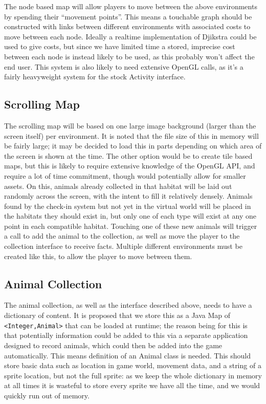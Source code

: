 \documentclass[12pt,a4paper,twoside]{article}
\begin{document}
The node based map will allow players to move between the above environments by spending their ``movement points''.
This means a touchable graph should be constructed with links between different environments with associated costs to move between each node.
Ideally a realtime implementation of Djikstra could be used to give costs, but since we have limited time a stored, imprecise cost between each node is instead likely to be used, as this probably won't affect the end user.
This system is also likely to need extensive OpenGL calls, as it's a fairly heavyweight system for the stock Activity interface.

\subsection{Scrolling Map}
The scrolling map will be based on one large image background (larger than the screen itself) per environment.
It is noted that the file size of this in memory will be fairly large; it may be decided to load this in parts depending on which area of the screen is shown at the time.
The other option would be to create tile based maps, but this is likely to require extensive knowledge of the OpenGL API, and require a lot of time commitment, though would potentially allow for smaller assets.
On this, animals already collected in that habitat will be laid out randomly across the screen, with the intent to fill it relatively densely.
Animals found by the check-in system but not yet in the virtual world will be placed in the habitats they should exist in, but only one of each type will exist at any one point in each compatible habitat.
Touching one of these new animals will trigger a call to add the animal to the collection, as well as move the player to the collection interface to receive facts.
Multiple different environments must be created like this, to allow the player to move between them.

\subsection{Animal Collection}
The animal collection, as well as the interface described above, needs to have a dictionary of content.
It is proposed that we store this as a Java Map of \verb|<Integer,Animal>| that can be loaded at runtime; the reason being for this is that potentially information could be added to this via a separate application designed to record animals, which could then be added into the game automatically.
This means definition of an Animal class is needed.
This should store basic data such as location in game world, movement data, and a string of a sprite location, but not the full sprite: as we keep the whole dictionary in memory at all times it is wasteful to store every sprite we have all the time, and we would quickly run out of memory.
\end{document}
